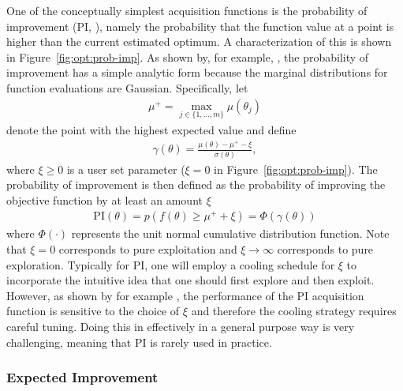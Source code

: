 One of the conceptually simplest acquisition functions is the probability of improvement (PI, \cite{kushner1964new}), namely
the probability that the function value at a point is higher than the current estimated optimum.  A
characterization of this is shown in Figure~\ref{fig:opt:prob-imp}.  As shown by, for example,
\cite{brochu2010tutorial}, the probability of improvement has a simple analytic form because the
marginal distributions for function evaluations are Gaussian.  Specifically, let
\begin{align}
\label{eq:opt:muplus}
\mu^+ = \max_{j\in \{1,\dots,m\}} \mu\left(\theta_j\right)
\end{align}
denote the point with the highest expected value and define
\begin{align}
\label{eq:opt:gamDef}
\gamma\left(\theta\right) = \frac{\mu \left(\theta\right)-\mu^+-\xi}{\sigma\left(\theta\right)},
\end{align}
where $\xi \ge 0$ is a user set parameter ($\xi=0$ in Figure~\ref{fig:opt:prob-imp}).
The probability of improvement is then defined as the probability of improving the 
objective function by at least an amount $\xi$
\begin{align}
\label{eq:opt:PI}
\mathrm{PI}\left(\theta\right) = p \left(f\left(\theta\right)\ge \mu^+ +\xi\right) = \Phi \left(\gamma\left(\theta\right)\right)
\end{align}
where $\Phi \left(\cdot\right)$ represents the unit normal cumulative distribution function.  
Note that $\xi=0$ corresponds to pure exploitation and $\xi \rightarrow \infty$ 
corresponds to pure exploration.  Typically for PI, one will employ a cooling schedule 
for $\xi$ to incorporate the intuitive idea that one should first explore and then 
exploit.  However, as shown by for example \cite{jones2001taxonomy}, 
the performance of the PI acquisition function is sensitive to the choice of 
$\xi$ and therefore the cooling strategy requires careful tuning.  Doing this in effectively in
a general purpose way is very challenging, meaning that PI
is rarely used in practice.

\subsubsection{Expected Improvement}
\label{sec:opt:BO:acq:expt}

